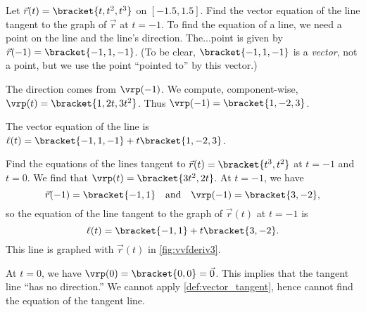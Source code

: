 \begin{example}\label{ex_vvfderiv1}%
Let
%
\iftoggle{in_threeD}{%
 \mtable{Graphing a curve in space with its tangent line.}{fig:vvfderiv1}{%
 \myincludeasythree{
 3Droll=0.5961816528018784,
 3Dortho=0.00514203542843461,
 3Dc2c=0.8352102637290955 0.5152699947357178 0.19214747846126556,
 3Dcoo=-5.658682346343994 19.23411750793457 0.2712952494621277,
 3Droo=149.99999927774635}{\marginparwidth}{Plane curve r (t)=⟨t, t^2–1⟩ (blue) with red tangent line l(t) = r(0)+t r′(0) touching at (0, 0).}{figures/figvvfderiv1_3D}}
}{%
 \mtable{Graphing a curve in space with its tangent line.}{fig:vvfderiv1}{%
 \myincludegraphics[alt={ALT-TEXT TO BE DETERMINED},width=\marginparwidth]{figures/figvvfderiv1_3D}
 \\(a)\\[10pt]
 \myincludegraphics[alt={ALT-TEXT TO BE DETERMINED},width=\marginparwidth]{figures/figvvfderiv1b_3D}
 \\(b)}%
}%
%
$\vec r(t) =\bracket{t,t^2,t^3}$ on $[-1.5,1.5]$. Find the vector equation of the line tangent to the graph of $\vec r$ at $t=-1$.
\solution
To find the equation of a line, we need a point on the line and the line's direction. The...point is given by $\vec r(-1) =\bracket{-1,1,-1}$. (To be clear, $\bracket{-1,1,-1}$ is a \emph{vector}, not a point, but we use the point ``pointed to'' by this vector.)

The direction comes from $\vrp(-1)$. We compute, component-wise, $\vrp(t) =\bracket{1,2t, 3t^2}$. Thus $\vrp(-1) =\bracket{1,-2,3}$. 

The vector equation of the line is $\ell(t) =\bracket{-1,1,-1}+ t\bracket{1,-2,3}$. \iftoggle{in_threeD}{This line and $\vec r(t)$ are sketched in \autoref{fig:vvfderiv1}.}{This line and $\vec r(t)$ are sketched, from two perspectives, in \autoref{fig:vvfderiv1} (a) and (b).}
\end{example}

\begin{example}\label{ex_vvfderiv3}%
Find the equations of the lines tangent to $\vec r(t) =\bracket{t^3,t^2}$ at $t=-1$ and $t=0$.
\solution
We find that $\vrp(t) =\bracket{3t^2,2t}$. At $t=-1$, we have
\[\vec r(-1) =\bracket{-1,1}\quad \text{and}\quad \vrp(-1) =\bracket{3,-2},\]
so the equation of the line tangent to the graph of $\vec r(t)$ at $t=-1$ is
\[\ell(t) =\bracket{-1,1}+ t\bracket{3,-2}.\]
This line is graphed with $\vec r(t)$ in \autoref{fig:vvfderiv3}.

At $t=0$, we have $\vrp(0) =\bracket{0,0}=\vec 0$. This implies that the tangent line ``has no direction.'' We cannot apply \autoref{def:vector_tangent}, hence cannot find the equation of the tangent line.
\end{example}


